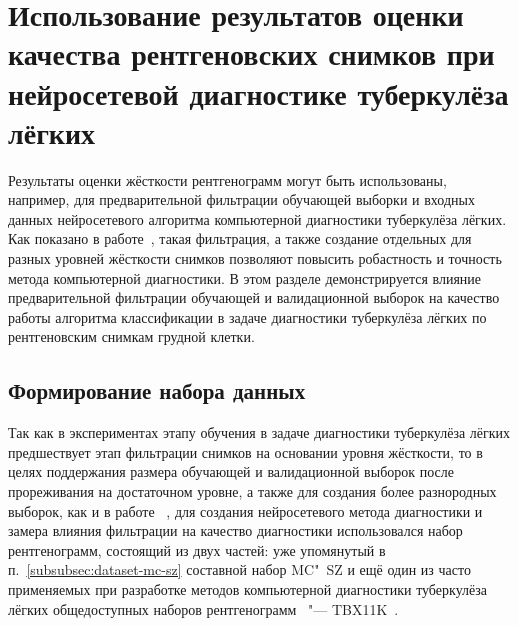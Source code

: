 \section{Использование результатов оценки качества рентгеновских снимков при нейросетевой диагностике туберкулёза лёгких}

Результаты оценки жёсткости рентгенограмм могут быть использованы, например, для предварительной фильтрации обучающей выборки и входных данных нейросетевого алгоритма компьютерной диагностики туберкулёза лёгких. Как показано в работе~\cite{dovganich2022automatic}, такая фильтрация, а также создание отдельных  для разных уровней жёсткости снимков позволяют повысить робастность и точность метода компьютерной диагностики. В этом разделе демонстрируется влияние предварительной фильтрации обучающей и валидационной выборок на качество работы алгоритма классификации в задаче диагностики туберкулёза лёгких по рентгеновским снимкам грудной клетки.

\subsection{Формирование набора данных} \label{subsubsec:dataset-tbx}

Так как в экспериментах этапу обучения  в задаче диагностики туберкулёза лёгких предшествует этап фильтрации снимков на основании уровня жёсткости, то в целях поддержания размера обучающей и валидационной выборок после прореживания на достаточном уровне, а также для создания более разнородных выборок, как и в работе ~\cite{dovganich2022automatic}, для создания нейросетевого метода диагностики и замера влияния фильтрации на качество диагностики использовался набор рентгенограмм, состоящий из двух частей: уже упомянутый в п.~\ref{subsubsec:dataset-mc-sz} составной набор MC"~SZ и ещё один из часто применяемых при разработке методов компьютерной диагностики туберкулёза лёгких общедоступных наборов рентгенограмм~\cite{singh2022evolution, santosh2022advances} "--- TBX11K~\cite{liu2020rethinking}.


